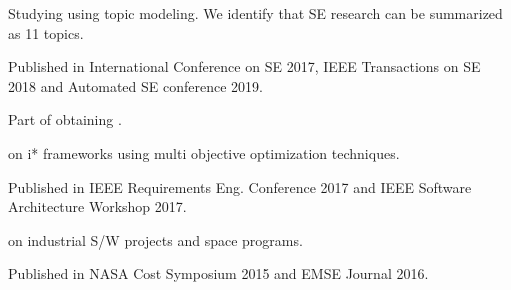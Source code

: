 \documentclass[]{bigfatnoob-resume}
\begin{document}
\begin{minipage}[t]{0.65\textwidth}
\begin{tightemize}
\item Studying  using topic modeling. We identify that SE research can be summarized as 11 topics. 
\item Published in International Conference on SE 2017, IEEE Transactions on SE 2018 and Automated SE conference 2019.
\item Part of obtaining .
\end{tightemize}
\sectionsep


\begin{tightemize}
\item {} on i* frameworks using multi objective optimization techniques.
\item Published in IEEE Requirements Eng. Conference 2017 and IEEE Software Architecture Workshop 2017.
\end{tightemize}
\sectionsep

\descript{}
\begin{tightemize}
\item {} on industrial S/W projects and space programs.
\item Published in NASA Cost Symposium 2015 and EMSE Journal 2016.
\end{tightemize}
\sectionsep

\end{minipage} 
\newpage

\end{document}
